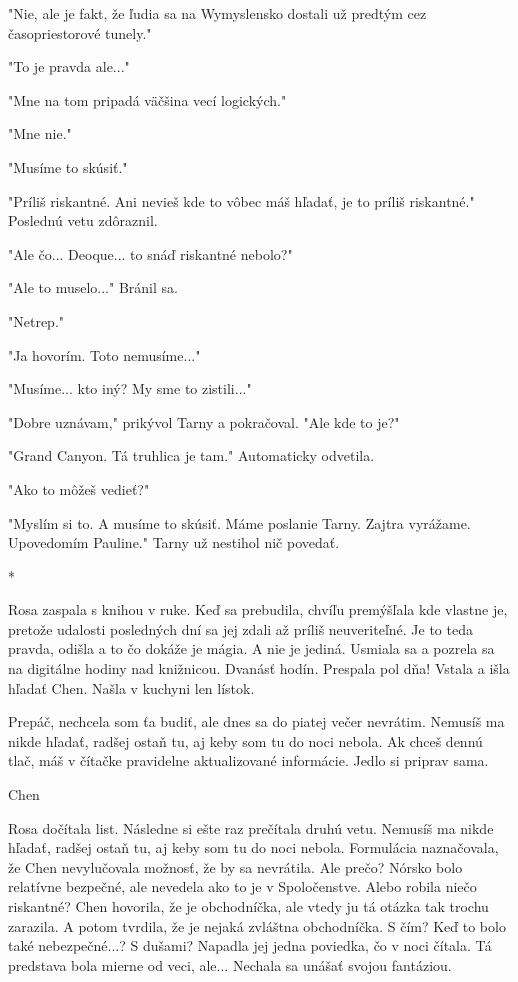 \documentclass{book}
\begin{document}
"$ $Nie, ale je fakt, že ľudia sa na Wymyslensko dostali už predtým cez časopriestorové tunely."$ $ 

"$ $To je pravda ale..."$ $ 

"$ $Mne na tom pripadá väčšina vecí logických."$ $ 

"$ $Mne nie."$ $ 

"$ $Musíme to skúsiť."$ $ 

"$ $Príliš riskantné. Ani nevieš kde to vôbec máš hľadať, je to príliš riskantné."$ $  Poslednú vetu zdôraznil.

"$ $Ale čo... Deoque... to snáď riskantné nebolo?"$ $ 

"$ $Ale to muselo..."$ $  Bránil sa.

"$ $Netrep."$ $ 

"$ $Ja hovorím. Toto nemusíme..."$ $ 

"$ $Musíme... kto iný? My sme to zistili..."$ $ 

"$ $Dobre uznávam,"$ $  prikývol Tarny a pokračoval. "$ $Ale kde to je?"$ $ 

"$ $Grand Canyon. Tá truhlica je tam."$ $  Automaticky odvetila.

"$ $Ako to môžeš vedieť?"$ $ 

"$ $Myslím si to. A musíme to skúsiť. Máme poslanie Tarny. Zajtra vyrážame. Upovedomím Pauline."$ $  Tarny už nestihol nič povedať.

\begin{center}

*

\end{center}

Rosa zaspala s knihou v ruke. Keď sa prebudila, chvíľu premýšľala kde vlastne je, pretože udalosti posledných dní sa jej zdali až príliš neuveriteľné. Je to teda pravda, odišla a to čo dokáže je mágia. A nie je jediná. Usmiala sa a pozrela sa na digitálne hodiny nad knižnicou. Dvanásť hodín. Prespala pol dňa! Vstala a išla hľadať Chen. Našla v kuchyni len lístok.

Prepáč, nechcela som ťa budiť, ale dnes sa do piatej večer nevrátim. Nemusíš ma nikde hľadať, radšej ostaň tu, aj keby som tu do noci nebola. Ak chceš dennú tlač, máš v čítačke pravidelne aktualizované informácie. Jedlo si priprav sama.

Chen

Rosa dočítala list. Následne si ešte raz prečítala druhú vetu. Nemusíš ma nikde hľadať, radšej ostaň tu, aj keby som tu do noci nebola. Formulácia naznačovala, že Chen nevylučovala možnosť, že by sa nevrátila. Ale prečo? Nórsko bolo relatívne bezpečné, ale nevedela ako to je v Spoločenstve. Alebo robila niečo riskantné? Chen hovorila, že je obchodníčka, ale vtedy ju tá otázka tak trochu zarazila. A potom tvrdila, že je nejaká zvláštna obchodníčka. S čím? Keď to bolo také nebezpečné...? S dušami? Napadla jej jedna poviedka, čo v noci čítala. Tá predstava bola mierne od veci, ale... Nechala sa unášať svojou fantáziou.
\end{document}
